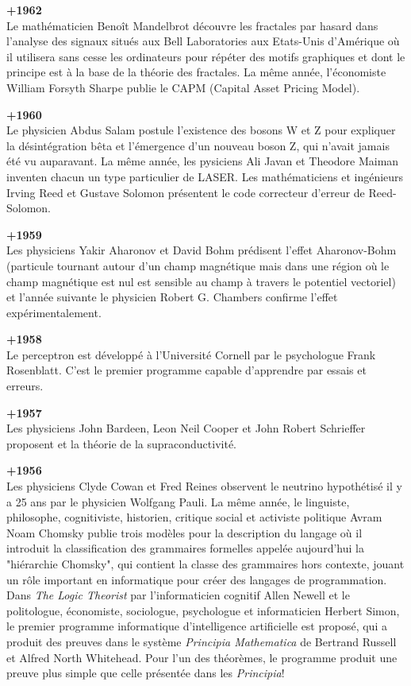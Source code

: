 \textbf{+1962}\\
Le mathématicien Benoît Mandelbrot découvre les fractales par hasard dans l'analyse des signaux situés aux Bell Laboratories aux Etats-Unis d'Amérique où il utilisera sans cesse les ordinateurs pour répéter des motifs graphiques et dont le principe est à la base de la théorie des fractales. La même année, l'économiste William Forsyth Sharpe publie le CAPM (Capital Asset Pricing Model).

\textbf{+1960}\\
Le physicien Abdus Salam postule l'existence des bosons W et Z pour expliquer la désintégration bêta et l'émergence d'un nouveau boson Z, qui n'avait jamais été vu auparavant. La même année, les pysiciens Ali Javan et Theodore Maiman inventen chacun un type particulier de LASER. Les mathématiciens et ingénieurs Irving Reed et Gustave Solomon présentent le code correcteur d'erreur de Reed-Solomon.

\textbf{+1959}\\
Les physiciens Yakir Aharonov et David Bohm prédisent l'effet Aharonov-Bohm (particule tournant autour d'un champ magnétique mais dans une région où le champ magnétique est nul est sensible au champ à travers le potentiel vectoriel) et l'année suivante le physicien Robert G. Chambers confirme l'effet expérimentalement.

\textbf{+1958}\\
Le perceptron est développé à l'Université Cornell par le psychologue  Frank Rosenblatt. C'est le premier programme capable d'apprendre par essais et erreurs.

\textbf{+1957}\\
Les physiciens John Bardeen, Leon Neil Cooper et John Robert Schrieffer proposent et la théorie de la supraconductivité.

\textbf{+1956}\\
Les physiciens Clyde Cowan et Fred Reines observent le neutrino hypothétisé il y a 25 ans par le physicien Wolfgang Pauli. La même année, le linguiste, philosophe, cognitiviste, historien, critique social et activiste politique Avram Noam Chomsky publie trois modèles pour la description du langage où il introduit la classification des grammaires formelles appelée aujourd'hui la "hiérarchie Chomsky", qui contient la classe des grammaires hors contexte, jouant un rôle important en informatique pour créer des langages de programmation. Dans \textit{The Logic Theorist} par l'informaticien cognitif Allen Newell et le politologue, économiste, sociologue, psychologue et informaticien Herbert Simon, le premier programme informatique d'intelligence artificielle est proposé, qui a produit des preuves dans le système \textit{Principia Mathematica} de Bertrand Russell et Alfred North Whitehead. Pour l'un des théorèmes, le programme produit une preuve plus simple que celle présentée dans les \textit{Principia}!

